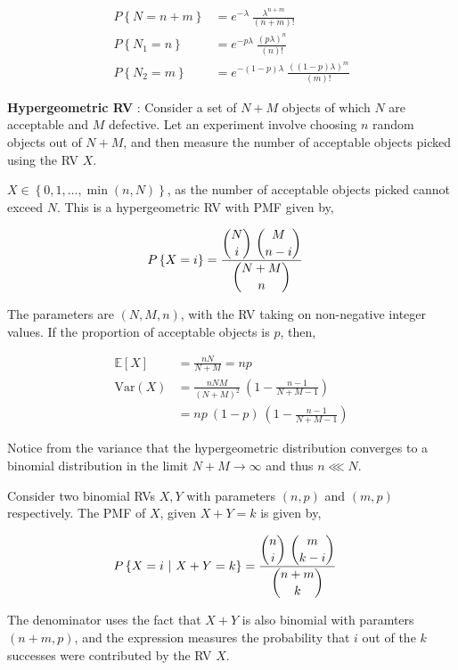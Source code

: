 \begin{align}
	P\left\{N = n+m\right\} &= e^{-\lambda} \ \frac{\lambda^{n+m}}{(n+m)!} \nonumber \\
	P\left\{N_1 = n\right\} &= e^{-p\lambda} \ \frac{(p\lambda)^{n}}{(n)!} \nonumber \\
	P\left\{N_2 = m\right\} &= e^{-(1-p)\lambda} \ \frac{((1-p)\lambda)^{m}}{(m)!}
\end{align}

\textbf{Hypergeometric RV} : Consider a set of $ N+M $ objects of which $ N $ are acceptable and $ M $ defective. Let an experiment involve choosing $ n $ random objects out of $ N+M $, and then measure the number of acceptable objects picked using the RV $ X $.

$ X \in \left\{0, 1, \dots, \min(n, N) \right\} $, as the number of acceptable objects picked cannot exceed $ N $. This is a hypergeometric RV with PMF given by,

\begin{align}
	P \left\{X = i\right\} &= \ddfrac{\binom{N}{i}\ \binom{M}{n-i}}{\binom{N+M}{n}}
\end{align}

The parameters are $ (N, M, n) $, with the RV taking on non-negative integer values. If the proportion of acceptable objects is $ p $, then,

\begin{align}
	\mathbb{E}[X] &= \frac{nN}{N+M} = np \\
	\mathrm{Var}(X) &= \frac{nNM}{(N+M)^2}\ \left(1 - \frac{n-1}{N+M-1}\right) \nonumber \\
	&=  np\ (1-p)\ \left(1 - \frac{n-1}{N+M-1}\right)
\end{align}

Notice from the variance that the hypergeometric distribution converges to a binomial distribution in the limit $ N+M \to \infty $ and thus $ n \lll N $.

Consider two binomial RVs $ X, Y $ with parameters $ (n, p) $ and $ (m, p) $ respectively. The PMF of $ X $, given $ X+Y = k $ is given by,

\begin{align}
	P \left\{X = i\ |\ X+Y = k\right\} &= \ddfrac{\binom{n}{i}\ \binom{m}{k-i}}{\binom{n+m}{k}}
\end{align}

The denominator uses the fact that $ X+Y $ is also binomial with paramters $ (n+m, p) $, and the expression measures the probability that $ i $ out of the $ k $ successes were contributed by the RV $ X $.

